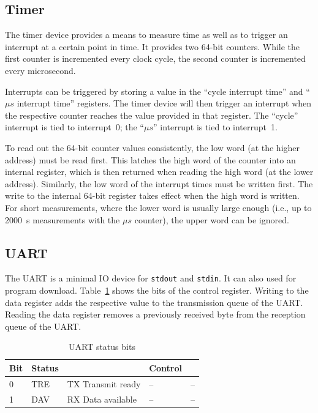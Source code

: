 \documentclass[a4paper,fontsize=10pt,twoside,DIV15,BCOR12mm,headinclude=true,footinclude=false,pagesize,bibtotoc]{scrbook}
\begin{document}
\subsection{Timer}

The timer device provides a means to measure time as well as to
trigger an interrupt at a certain point in time. It provides two
64-bit counters. While the first counter is incremented every clock
cycle, the second counter is incremented every microsecond.

Interrupts can be triggered by storing a value in the ``cycle
interrupt time'' and ``$\mu s$ interrupt time'' registers. The timer
device will then trigger an interrupt when the respective counter
reaches the value provided in that register. The ``cycle'' interrupt
is tied to interrupt~0; the ``$\mu s$'' interrupt is tied to
interrupt~1.

To read out the 64-bit counter values consistently, the low word (at
the higher address) must be read first. This latches the high word of
the counter into an internal register, which is then returned when
reading the high word (at the lower address). Similarly, the low word
of the interrupt times must be written first. The write to the
internal 64-bit register takes effect when the high word is written.
For short measurements, where the lower word is usually large enough
(i.e., up to 2000~s measurements with the $\mu s$ counter), the upper
word can be ignored.

\subsection{UART}

The UART is a minimal IO device for \texttt{stdout} and
\texttt{stdin}.  It can also used for program
download. Table~\ref{tab:uart} shows the bits of the control
register. Writing to the data register adds the respective value to
the transmission queue of the UART. Reading the data register removes
a previously received byte from the reception queue of the UART.

\begin{table}
\centering
\begin{tabular}{lllll}
\toprule
Bit & Status & & Control & \\
\midrule
0 & TRE & TX Transmit ready & -- & -- \\
1 & DAV & RX Data available & -- & -- \\
\bottomrule
\end{tabular}
\caption{UART status bits} %
\label{tab:uart}
\end{table}
\end{document}
